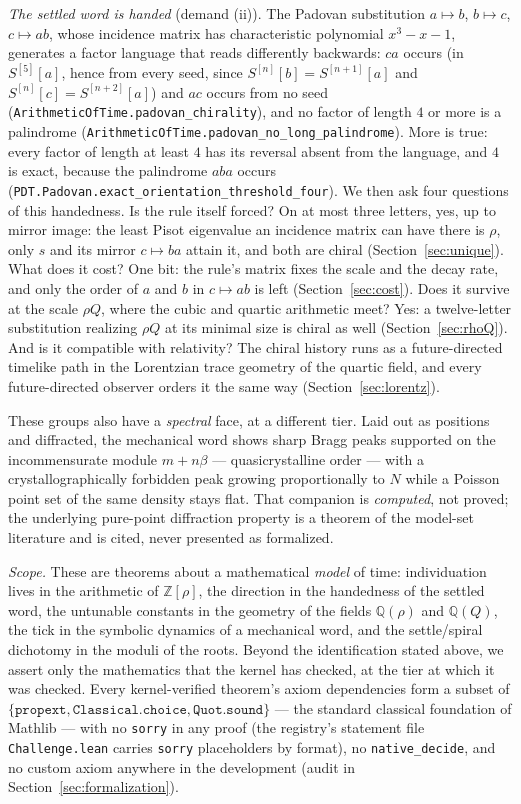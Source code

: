 \documentclass[11pt]{amsart}
\theoremstyle{plain}
\theoremstyle{definition}
\theoremstyle{remark}
\begin{document}
\emph{The settled word is handed} (demand (ii)). The Padovan substitution $a \mapsto b$, $b \mapsto c$, $c \mapsto ab$, whose incidence matrix has characteristic polynomial $x^3 - x - 1$, generates a factor language that reads differently backwards: $ca$ occurs (in $S^{[5]}[a]$, hence from every seed, since $S^{[n]}[b] = S^{[n+1]}[a]$ and $S^{[n]}[c] = S^{[n+2]}[a]$) and $ac$ occurs from no seed (\texttt{ArithmeticOfTime.padovan\_chirality}), and no factor of length $4$ or more is a palindrome (\texttt{ArithmeticOfTime.padovan\_no\_long\_palindrome}). More is true: every factor of length at least $4$ has its reversal absent from the language, and $4$ is exact, because the palindrome $aba$ occurs (\texttt{PDT.Padovan.exact\_orientation\_threshold\_four}). We then ask four questions of this handedness. Is the rule itself forced? On at most three letters, yes, up to mirror image: the least Pisot eigenvalue an incidence matrix can have there is $\rho$, only $s$ and its mirror $c \mapsto ba$ attain it, and both are chiral (Section~\ref{sec:unique}). What does it cost? One bit: the rule's matrix fixes the scale and the decay rate, and only the order of $a$ and $b$ in $c \mapsto ab$ is left (Section~\ref{sec:cost}). Does it survive at the scale $\rho Q$, where the cubic and quartic arithmetic meet? Yes: a twelve-letter substitution realizing $\rho Q$ at its minimal size is chiral as well (Section~\ref{sec:rhoQ}). And is it compatible with relativity? The chiral history runs as a future-directed timelike path in the Lorentzian trace geometry of the quartic field, and every future-directed observer orders it the same way (Section~\ref{sec:lorentz}).

These groups also have a \emph{spectral} face, at a different tier. Laid out as positions and diffracted, the mechanical word shows sharp Bragg peaks supported on the incommensurate module $m + n\beta$ --- quasicrystalline order --- with a crystallographically forbidden peak growing proportionally to $N$ while a Poisson point set of the same density stays flat. That companion is \emph{computed}, not proved; the underlying pure-point diffraction property is a theorem of the model-set literature \cite{hof1995,schlottmann2000,baakegrimm2013} and is cited, never presented as formalized.

\emph{Scope.} These are theorems about a mathematical \emph{model} of time: individuation lives in the arithmetic of $\mathbb{Z}[\rho]$, the direction in the handedness of the settled word, the untunable constants in the geometry of the fields $\mathbb{Q}(\rho)$ and $\mathbb{Q}(Q)$, the tick in the symbolic dynamics of a mechanical word, and the settle/spiral dichotomy in the moduli of the roots.  Beyond the identification stated above, we assert only the mathematics that the kernel has checked, at the tier at which it was checked.{} Every kernel-verified theorem's axiom dependencies form a subset of $\{\texttt{propext}, \texttt{Classical.choice}, \texttt{Quot.sound}\}$ --- the standard classical foundation of Mathlib --- with no \texttt{sorry} in any proof (the registry's statement file \texttt{Challenge.lean} carries \texttt{sorry} placeholders by format), no \texttt{native\_decide}, and no custom axiom anywhere in the development (audit in Section~\ref{sec:formalization}).
\end{document}
